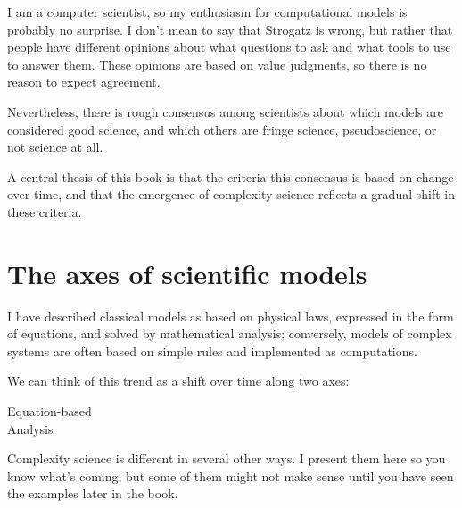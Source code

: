 \documentclass[12pt]{book}
\theoremstyle{exercise}
\newcommand{\myrightarrow}{\ensuremath \rightarrow}
\begin{document}
I am a computer scientist, so my enthusiasm for computational models
is probably no surprise.  I don't mean to say that Strogatz is wrong,
but rather that people have different opinions about what questions to
ask and what tools to use to answer them.  These opinions are based
on value judgments, so there is no reason to expect agreement.


Nevertheless, there is rough consensus among scientists
about which models are considered good science, and which others
are fringe science, pseudoscience, or not science at all.


A central thesis of this book is that the
criteria this consensus is based on change over time, and that
the emergence of complexity science reflects a gradual shift in
these criteria.


\section{The axes of scientific models}

I have described classical models as based on physical laws, expressed
in the form of equations, and solved by mathematical analysis;
conversely, models of complex systems are often based on simple
rules and implemented as computations.


We can think of this trend as a shift over time along two axes:

\begin{description}

\item[Equation-based \myrightarrow~simulation-based] \quad

\item[Analysis \myrightarrow~computation] \quad

\end{description}

Complexity science is different in several other ways.  I present them
here so you know what's coming, but some of them might not make sense
until you have seen the examples later in the book.
\end{document}
